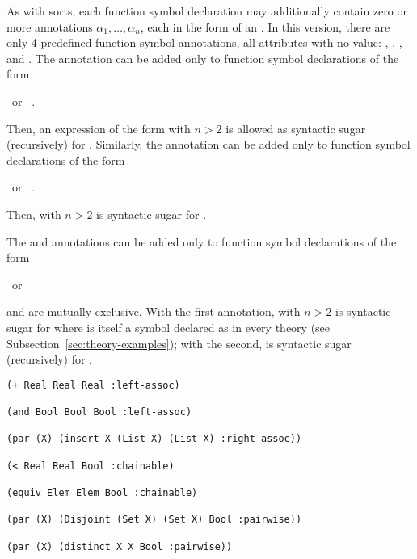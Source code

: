As with sorts, each function symbol declaration 
may additionally contain zero or more annotations $\alpha_1, \ldots, \alpha_n$,
each in the form of an .
In this version, there are only 4 predefined function symbol annotations,
all attributes with no value:
, 
,
,
and
. 
The  annotation can be added only 
to function symbol declarations of the form
\begin{center}
\ or \ 
.
\end{center}
Then, an expression of the form  
with $n > 2$ is allowed as syntactic sugar (recursively) for
.
Similarly,
the  annotation can be added only 
to function symbol declarations of the form
\begin{center}
\ or \ 
.
\end{center}
Then, \expr{($f$ $t_1\ \cdots\ t_n$)} with $n > 2$ is syntactic sugar for
.

The  and  annotations can be added only 
to function symbol declarations of the form
\begin{center}
\ or \ 
\end{center}
and are mutually exclusive.
With the first annotation, 
 with $n > 2$ is syntactic sugar for
where \ter{and} is itself a symbol declared as 
in every theory (see Subsection~\ref{sec:theory-examples});
with the second, \expr{($f$ $t_1\ \cdots\ t_n$)} is syntactic sugar 
(recursively) for
. 
\medskip


\begin{lstlisting}[linewidth=35em]
(+ Real Real Real :left-assoc)

(and Bool Bool Bool :left-assoc)

(par (X) (insert X (List X) (List X) :right-assoc))

(< Real Real Bool :chainable)

(equiv Elem Elem Bool :chainable) 

(par (X) (Disjoint (Set X) (Set X) Bool :pairwise))

(par (X) (distinct X X Bool :pairwise))
\end{lstlisting}
\medskip


